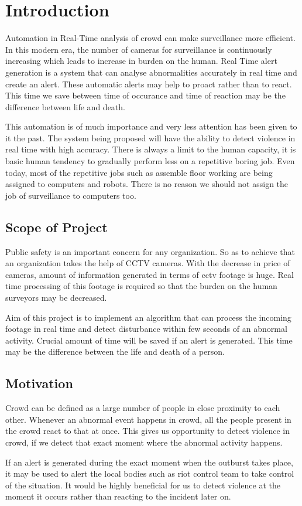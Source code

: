 \chapter{Introduction}

Automation in Real-Time analysis of crowd can make surveillance more efficient. In this modern era, the number of cameras for surveillance is continuously increasing which leads to increase in burden on the human. Real Time alert generation is a system that can analyse abnormalities accurately in real time and create an alert. These automatic alerts may help to proact rather than to react.
This time we save between time of occurance and time of reaction may be the difference between life and death.
\par
This automation is of much importance and very less attention has been given to it the past. The system being proposed will have the ability to detect violence in real time with high accuracy. There is always a limit to the human capacity, it is basic human tendency to gradually perform less on a repetitive boring job. Even today, most of the repetitive jobs such as assemble floor working are being assigned to computers and robots. There is no reason we should not assign the job of surveillance to computers too.

\section{Scope of Project}
Public safety is an important concern for any organization. So as to achieve that an organization takes the help of CCTV cameras. With the decrease in price of cameras, amount of information generated in terms of cctv footage is huge. Real time processing of this footage is required so that the burden on the human surveyors may be decreased.
\par
Aim of this project is to implement an algorithm that can process the incoming footage in real time and detect disturbance within few seconds of an abnormal activity. Crucial amount of time will be saved if an alert is generated. This time may be the difference between the life and death of a person.

\section{Motivation}
Crowd can be defined as a large number of people in close proximity to each other. Whenever an abnormal event happens in crowd, all the people present in the crowd react to that at once. This gives us opportunity to  detect violence in crowd, if we detect that exact moment where the abnormal activity happens.
\par 
If an alert is generated during the exact moment when the outburst takes place, it may be used to alert the local bodies such as riot control team to take control of the situation. It would be highly beneficial for us to detect violence at the moment it occurs rather than reacting to the incident later on.

